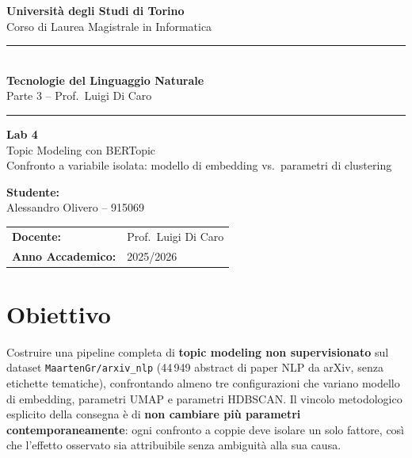 \documentclass[12pt,a4paper]{article}
\newcommand{\HRule}{\rule{\linewidth}{0.5mm}}
\begin{document}
\raggedbottom

\begin{titlepage}
  \centering
  \vspace*{1.5cm}

  {\Large\textbf{Universit\`a degli Studi di Torino}\\[0.3em]
  Corso di Laurea Magistrale in Informatica}

  \vspace{1cm}
  \HRule\\[0.4em]
  {\LARGE\textbf{Tecnologie del Linguaggio Naturale}}\\[0.3em]
  {\large Parte 3 -- Prof.\ Luigi Di Caro}\\[0.2em]
  \HRule

  \vspace{1.2cm}
  {\huge\textbf{Lab 4}}\\[0.5em]
  {\LARGE Topic Modeling con BERTopic}\\[0.4em]
  {\large Confronto a variabile isolata: modello di embedding vs.\ parametri di clustering}

  \vspace{2cm}

  {\large\textbf{Studente:}}\\[0.8em]
  Alessandro Olivero -- 915069

  \vspace{1.5cm}
  \begin{tabular}{ll}
    \textbf{Docente:}          & Prof.\ Luigi Di Caro \\[0.3em]
    \textbf{Anno Accademico:}  & 2025/2026 \\
  \end{tabular}

  \vfill
\end{titlepage}

\tableofcontents
\newpage

\section{Obiettivo}

Costruire una pipeline completa di \textbf{topic modeling non supervisionato} sul dataset \texttt{MaartenGr/arxiv\_nlp} (44\,949 abstract di paper NLP da arXiv, senza etichette tematiche), confrontando almeno tre configurazioni che variano modello di embedding, parametri UMAP e parametri HDBSCAN. Il vincolo metodologico esplicito della consegna \`e di \textbf{non cambiare pi\`u parametri contemporaneamente}: ogni confronto a coppie deve isolare un solo fattore, cos\`i che l'effetto osservato sia attribuibile senza ambiguit\`a alla sua causa.
\end{document}
